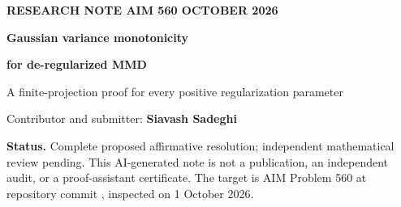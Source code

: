 \documentclass[11pt]{article}
\theoremstyle{remark}
\begin{document}
\thispagestyle{empty}
{\small\sffamily\bfseries RESEARCH NOTE \quad AIM 560  OCTOBER 2026}
\vspace{8pt}
\begin{center}
{\LARGE\bfseries Gaussian variance monotonicity\par}
\vspace{4pt}
{\LARGE\bfseries for de-regularized MMD\par}
\vspace{10pt}
{\large A finite-projection proof for every positive regularization parameter}
\end{center}
\vspace{4pt}
\begin{center}
Contributor and submitter: \textbf{Siavash Sadeghi}
\end{center}
\textbf{Status.} Complete proposed affirmative resolution; independent mathematical review pending.
This AI-generated note is not a publication, an independent audit, or a proof-assistant certificate.
The target is AIM Problem 560 at repository commit , inspected on 1 October 2026.

\begin{abstract}
For a centered one-dimensional Gaussian target and the Gaussian kernel, we prove the strict sign inequality governing the variance in the Gaussian moment approximation to de-regularized maximum mean discrepancy (DrMMD) flow. The result holds for every target variance $s>0$, every finite regularization parameter $\lambda>0$, and every current variance $0<v<s$, removing the target statement's restriction $s>2$. The proof reduces the Gaussian expectations to a weighted power-series curve. Every finite initial block of its coordinates has a strictly negative directional inner product toward the target. A truncated negative-binomial mean bound proves this fact for positive curve parameters; a polynomial boundary identity proves it for zero and negative parameters. Summation by parts then handles all nonnegative decreasing spectral weights, including the DrMMD resolvent. The Gaussian moment variance consequently increases to its target. The analytic argument does not rely on the accompanying computations.
\end{abstract}
\end{document}
